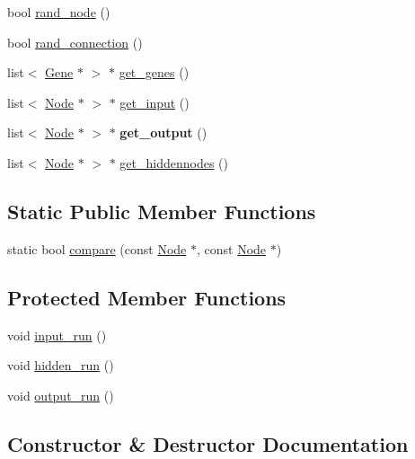 \begin{DoxyCompactItemize}
\item 
bool \hyperlink{classNetwork_a29676c0b42a6123b441e7f1fcba522b4}{rand\+\_\+node} ()
\item 
bool \hyperlink{classNetwork_a5f85af3cb52fcab5b15b226496686e77}{rand\+\_\+connection} ()
\item 
list$<$ \hyperlink{classGene}{Gene} $\ast$ $>$ $\ast$ \hyperlink{classNetwork_a5c44d0a8c6c866df44d58becdde9fd18}{get\+\_\+genes} ()
\item 
list$<$ \hyperlink{classNode}{Node} $\ast$ $>$ $\ast$ \hyperlink{classNetwork_ac348d720cf84bd0cea6b1530e8afe7fa}{get\+\_\+input} ()
\item 
list$<$ \hyperlink{classNode}{Node} $\ast$ $>$ $\ast$ {\bfseries get\+\_\+output} ()\hypertarget{classNetwork_aa6aa0b2129738127f715a2841c07331c}{}\label{classNetwork_aa6aa0b2129738127f715a2841c07331c}

\item 
list$<$ \hyperlink{classNode}{Node} $\ast$ $>$ $\ast$ \hyperlink{classNetwork_a5c004b11400079855ed37a932732f6b8}{get\+\_\+hiddennodes} ()
\end{DoxyCompactItemize}
\subsection*{Static Public Member Functions}
\begin{DoxyCompactItemize}
\item 
static bool \hyperlink{classNetwork_a243d53ec51b12215d7c5709c93642d88}{compare} (const \hyperlink{classNode}{Node} $\ast$, const \hyperlink{classNode}{Node} $\ast$)
\end{DoxyCompactItemize}
\subsection*{Protected Member Functions}
\begin{DoxyCompactItemize}
\item 
void \hyperlink{classNetwork_ab86fd33a8f5a6eeb4536fedcc9303d36}{input\+\_\+run} ()
\item 
void \hyperlink{classNetwork_aed28978ec567d20480990b8d8391bb3a}{hidden\+\_\+run} ()
\item 
void \hyperlink{classNetwork_a4bf0d1ed13ea2e8d09072809655e1727}{output\+\_\+run} ()
\end{DoxyCompactItemize}


\subsection{Constructor \& Destructor Documentation}
